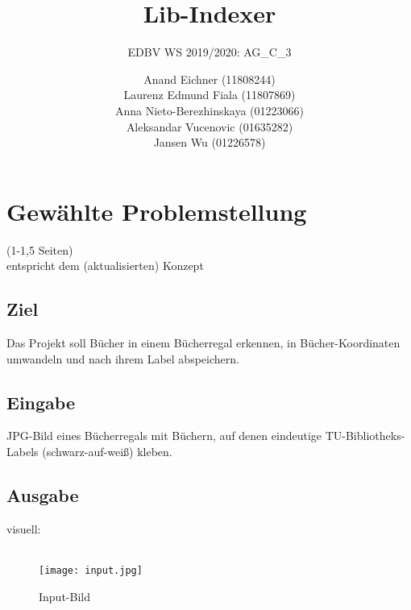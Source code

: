 \documentclass[paper=A4, deutsch]{scrartcl}
\begin{document}

\title{Lib-Indexer} %

\subtitle{EDBV WS 2019/2020: AG\_C\_3} %


\author{Anand Eichner (11808244)\\
Laurenz Edmund Fiala (11807869)\\
Anna Nieto-Berezhinskaya (01223066)\\
Aleksandar Vucenovic (01635282)\\
Jansen Wu (01226578)}




\maketitle


\section{Gewählte Problemstellung}
(1-1,5 Seiten)\\
entspricht dem (aktualisierten) Konzept
\subsection{Ziel}
Das Projekt soll Bücher in einem Bücherregal erkennen, in Bücher-Koordinaten umwandeln und nach ihrem Label abspeichern.

\subsection{Eingabe}
JPG-Bild eines Bücherregals mit Büchern, auf denen eindeutige TU-Bibliotheks-Labels (schwarz-auf-weiß) kleben.

\subsection{Ausgabe}
visuell:\\
\\
\begin{figure}[H]
 \centering
 \texttt{[image: input.jpg]}
 \caption{Input-Bild}
 \label{fig:img}
\end{figure}
\end{document}
